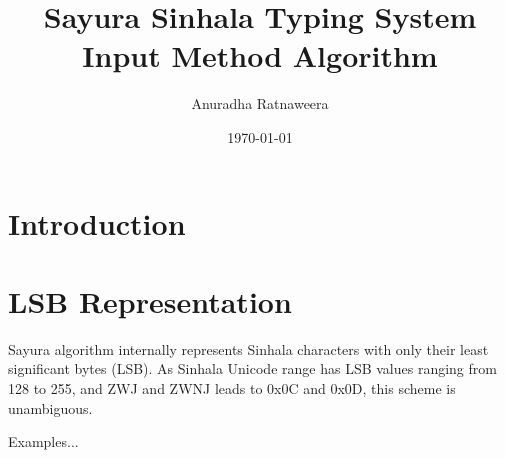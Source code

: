 \documentclass[a4paper,twocolumn]{article}
\begin{document}
\title{Sayura Sinhala Typing System\\Input Method Algorithm}
\author{Anuradha Ratnaweera}
\date{\today}
\maketitle

\section{Introduction}

\section{LSB Representation}

Sayura algorithm internally represents Sinhala characters with only
their least significant bytes (LSB).  As Sinhala Unicode range has LSB
values ranging from 128 to 255, and ZWJ and ZWNJ leads to 0x0C and 0x0D,
this scheme is unambiguous.

Examples...
\end{document}

